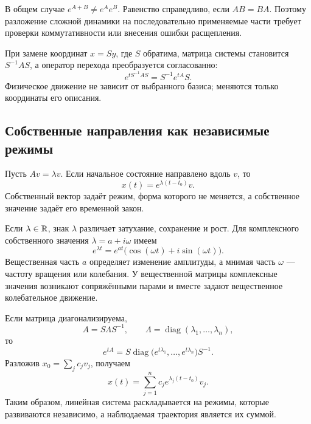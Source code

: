 \begin{caution}
В общем случае $e^{A+B}\neq e^Ae^B$. Равенство справедливо, если $AB=BA$. Поэтому разложение сложной динамики на последовательно применяемые части требует проверки коммутативности или внесения ошибки расщепления.
\end{caution}

При замене координат $x=Sy$, где $S$ обратима, матрица системы становится $S^{-1}AS$, а оператор перехода преобразуется согласованно:
\begin{equation}
\label{eq:matrix-exponential-coordinate-change-v02}
e^{tS^{-1}AS}=S^{-1}e^{tA}S.
\end{equation}
Физическое движение не зависит от выбранного базиса; меняются только координаты его описания.

\subsection{Собственные направления как независимые режимы}

Пусть $Av=\lambda v$. Если начальное состояние направлено вдоль $v$, то
\begin{equation}
\label{eq:eigenmode-evolution-v02}
x(t)=e^{\lambda(t-t_0)}v.
\end{equation}
Собственный вектор задаёт режим, форма которого не меняется, а собственное значение задаёт его временной закон.

Если $\lambda\in\mathbb{R}$, знак $\lambda$ различает затухание, сохранение и рост. Для комплексного собственного значения $\lambda=a+i\omega$ имеем
\[
e^{\lambda t}=e^{at}\bigl(\cos(\omega t)+i\sin(\omega t)\bigr).
\]
Вещественная часть $a$ определяет изменение амплитуды, а мнимая часть $\omega$ --- частоту вращения или колебания. У вещественной матрицы комплексные значения возникают сопряжёнными парами и вместе задают вещественное колебательное движение.

Если матрица диагонализируема,
\[
A=S\Lambda S^{-1},
\qquad
\Lambda=\operatorname{diag}(\lambda_1,\ldots,\lambda_n),
\]
то
\begin{equation}
\label{eq:diagonalizable-linear-flow-v02}
e^{tA}
=
S\operatorname{diag}\bigl(e^{t\lambda_1},\ldots,e^{t\lambda_n}\bigr)S^{-1}.
\end{equation}
Разложив $x_0=\sum_j c_jv_j$, получаем
\begin{equation}
\label{eq:modal-decomposition-v02}
x(t)=\sum_{j=1}^{n}c_j e^{\lambda_j(t-t_0)}v_j.
\end{equation}
Таким образом, линейная система раскладывается на режимы, которые развиваются независимо, а наблюдаемая траектория является их суммой.

